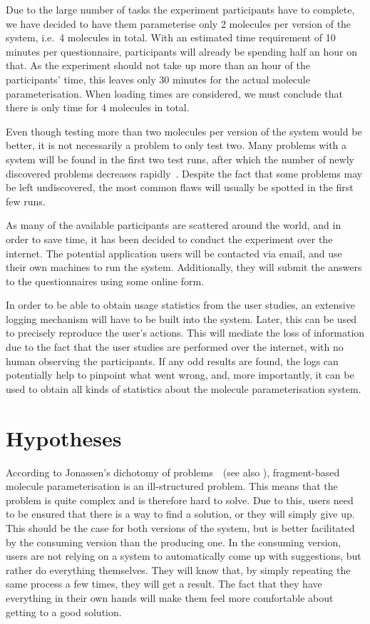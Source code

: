 Due to the large number of tasks the experiment participants have to complete, we have decided to have them parameterise only 2 molecules per version of the system, i.e.\ 4 molecules in total. With an estimated time requirement of 10 minutes per questionnaire, participants will already be spending half an hour on that. As the experiment should not take up more than an hour of the participants' time, this leaves only 30 minutes for the actual molecule parameterisation. When loading times are considered, we must conclude that there is only time for 4 molecules in total.

Even though testing more than two molecules per version of the system would be better, it is not necessarily a problem to only test two. Many problems with a system will be found in the first two test runs, after which the number of newly discovered problems decreases rapidly~\cite{krug2006dont, nielsen2000you}. Despite the fact that some problems may be left undiscovered, the most common flaws will usually be spotted in the first few runs.

As many of the available participants are scattered around the world, and in order to save time, it has been decided to conduct the experiment over the internet. The potential application users will be contacted via email, and use their own machines to run the system. Additionally, they will submit the answers to the questionnaires using some online form.

In order to be able to obtain usage statistics from the user studies, an extensive logging mechanism will have to be built into the system. Later, this can be used to precisely reproduce the user's actions. This will mediate the loss of information due to the fact that the user studies are performed over the internet, with no human observing the participants. If any odd results are found, the logs can potentially help to pinpoint what went wrong, and, more importantly, it can be used to obtain all kinds of statistics about the molecule parameterisation system.



\section{Hypotheses}
According to Jonassen's dichotomy of problems~\cite{jonassen2000toward}~(see also ), fragment-based molecule parameterisation is an ill-structured problem. This means that the problem is quite complex and is therefore hard to solve. Due to this, users need to be ensured that there is a way to find a solution, or they will simply give up. This should be the case for both versions of the system, but is better facilitated by the consuming version than the producing one. In the consuming version, users are not relying on a system to automatically come up with suggestions, but rather do everything themselves. They will know that, by simply repeating the same process a few times, they will get a result. The fact that they have everything in their own hands will make them feel more comfortable about getting to a good solution.


